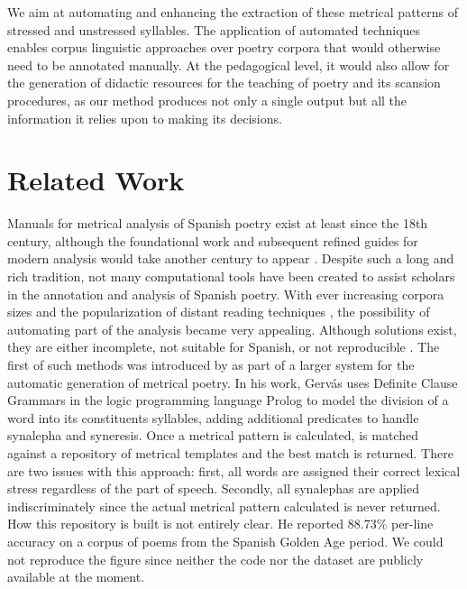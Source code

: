 \documentclass[a4paper,11pt,twocolumn,twoside]{article}
\begin{document}
We aim at automating and enhancing the extraction of these metrical patterns of stressed and unstressed syllables. The application of automated techniques enables corpus linguistic approaches over poetry corpora that would otherwise need to be annotated manually. At the pedagogical level, it would also allow for the generation of didactic resources for the teaching of poetry and its scansion procedures, as our method produces not only a single output but all the information it relies upon to making its decisions.

\section{Related Work}
Manuals for metrical analysis of Spanish poetry exist at least since the 18th century, although the foundational work and subsequent refined guides for modern analysis would take another century to appear \cite{navarro1991metrica,caparros1993metrica}. Despite such a long and rich tradition, not many computational tools have been created to assist scholars in the annotation and analysis of Spanish poetry. With ever increasing corpora sizes and the popularization of distant reading techniques \cite{moretti2013distant}, the possibility of automating part of the analysis became very appealing. Although solutions exist, they are either incomplete, not suitable for Spanish, or not reproducible \cite{hartman2005scandroid,agirrezabal2016zeuscansion}. The first of such methods was introduced by  as part of a larger system for the automatic generation of metrical poetry. In his work, Gervás uses Definite Clause Grammars in the logic programming language Prolog to model the division of a word into its constituents syllables, adding additional predicates to handle synalepha and syneresis. Once a metrical pattern is calculated, is matched against a repository of metrical templates and the best match is returned. There are two issues with this approach: first, all words are assigned their correct lexical stress regardless of the part of speech. Secondly, all synalephas are applied indiscriminately since the actual metrical pattern calculated is never returned. How this repository is built is not entirely clear. He reported 88.73\% per-line accuracy on a corpus of poems from the Spanish Golden Age period. We could not reproduce the figure since neither the code nor the dataset are publicly available at the moment.
\end{document}
